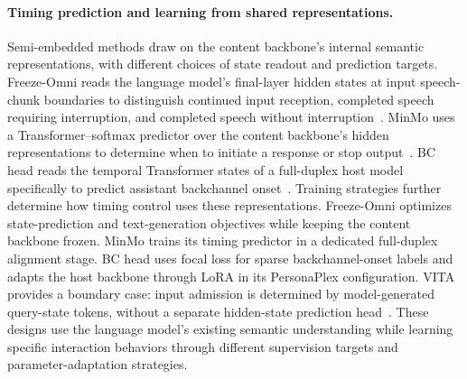 \paragraph{Timing prediction and learning from shared representations.}
Semi-embedded methods draw on the content backbone's internal semantic representations, with different choices of state readout and prediction targets. Freeze-Omni reads the language model's final-layer hidden states at input speech-chunk boundaries to distinguish continued input reception, completed speech requiring interruption, and completed speech without interruption~\citep{DBLP:journals/corr/abs-2411-00774}. MinMo uses a Transformer--softmax predictor over the content backbone's hidden representations to determine when to initiate a response or stop output~\citep{DBLP:journals/corr/abs-2501-06282}. BC head reads the temporal Transformer states of a full-duplex host model specifically to predict assistant backchannel onset~\citep{DBLP:journals/corr/abs-2609-29418}. Training strategies further determine how timing control uses these representations. Freeze-Omni optimizes state-prediction and text-generation objectives while keeping the content backbone frozen. MinMo trains its timing predictor in a dedicated full-duplex alignment stage. BC head uses focal loss for sparse backchannel-onset labels and adapts the host backbone through LoRA in its PersonaPlex configuration. VITA provides a boundary case: input admission is determined by model-generated query-state tokens, without a separate hidden-state prediction head~\citep{DBLP:journals/corr/abs-2408-05211}. These designs use the language model's existing semantic understanding while learning specific interaction behaviors through different supervision targets and parameter-adaptation strategies.

